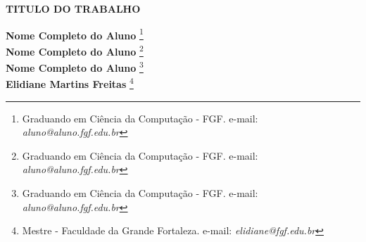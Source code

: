 \documentclass[12pt]{article}
\begin{document}

%



\begin{center}
\textbf{\Large{TITULO DO TRABALHO}}\\
\end{center}

\vspace*{0.2cm}

\begin{flushright}
 {\bf Nome Completo do Aluno} \footnote[1]{Graduando em Ciência da Computação - FGF. e-mail: \it aluno@aluno.fgf.edu.br}  \\
 {\bf Nome Completo do Aluno} \footnote[2]{Graduando em Ciência da Computação - FGF. e-mail: \it aluno@aluno.fgf.edu.br}  \\
  {\bf Nome Completo do Aluno} \footnote[3]{Graduando em Ciência da Computação - FGF. e-mail: \it aluno@aluno.fgf.edu.br}  \\
   {\bf Elidiane Martins Freitas} \footnote[4]{Mestre - Faculdade da Grande Fortaleza. e-mail: \it elidiane@fgf.edu.br}   \\
\end{flushright}

\vspace*{0.5cm}

\end{document}
